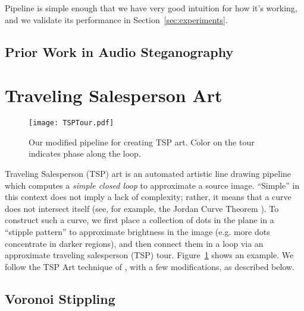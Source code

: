 \documentclass[runningheads]{llncs}
\begin{document}
Pipeline is simple enough that we have very good intuition for how it's working, and we validate its performance in Section~\ref{sec:experiments}.


\subsection{Prior Work in Audio Steganography}

\section{Traveling Salesperson Art}

\begin{figure}
  \centering
  \texttt{[image: TSPTour.pdf]}
  \caption{Our modified pipeline for creating TSP art.  Color on the tour indicates phase along the loop.}
  \label{fig:TSPTour}
\end{figure}

Traveling Salesperson (TSP) art \cite{bosch2004continuous, kaplan2005tsp,bosch2008connecting} is an automated artistic line drawing pipeline which computes a {\em simple closed loop} to approximate a source image.  ``Simple'' in this context does not imply a lack of complexity; rather, it means that a curve does not intersect itself (see, for example, the Jordan Curve Theorem \cite{bosch2009jordan}).  To construct such a curve, we first place a collection of dots in the plane in a ``stipple pattern'' to approximate brightness in the image (e.g. more dots concentrate in darker regions), and then connect them in a loop via an approximate traveling salesperson (TSP) tour.  Figure~\ref{fig:TSPTour} shows an example.  We follow the TSP Art technique of \cite{kaplan2005tsp}, with a few modifications, as described below.


\subsection{Voronoi Stippling}
\label{sec:stippling}
\end{document}
